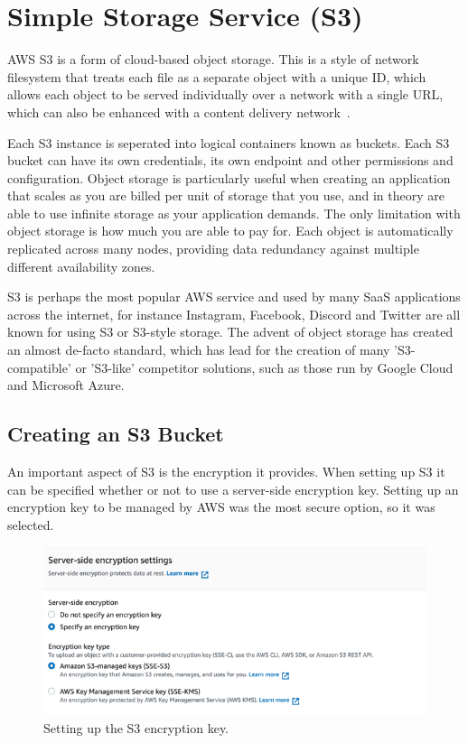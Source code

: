 \chapter{Simple Storage Service (S3)}\label{ch:simple-storage-service}

AWS S3 is a form of cloud-based object storage.
This is a style of network filesystem that treats each file as a separate object with a unique ID, which allows each
object to be served individually over a network with a single URL, which can also be enhanced with a content delivery
network~\parencite{amazon2022cloud}.

Each S3 instance is seperated into logical containers known as buckets.
Each S3 bucket can have its own credentials, its own endpoint and other permissions and configuration.
Object storage is particularly useful when creating an application that scales as you are billed per unit of storage
that you use, and in theory are able to use infinite storage as your application demands.
The only limitation with object storage is how much you are able to pay for.
Each object is automatically replicated across many nodes, providing data redundancy against multiple different
availability zones.

S3 is perhaps the most popular AWS service and used by many SaaS applications across the internet, for instance
Instagram, Facebook, Discord and Twitter are all known for using S3 or S3-style storage.
The advent of object storage has created an almost de-facto standard, which has lead for the creation of many
'S3-compatible' or 'S3-like' competitor solutions, such as those run by Google Cloud and Microsoft Azure.

\pagebreak
\section{Creating an S3 Bucket}\label{sec:creating-an-s3-bucket}

An important aspect of S3 is the encryption it provides.
When setting up S3 it can be specified whether or not to use a server-side encryption key.
Setting up an encryption key to be managed by AWS was the most secure option, so it was selected.

\begin{figure}[!htbp]
    \centering
    \includegraphics[width=\textwidth]{resources/s3/s3_encryption}
    \caption{Setting up the S3 encryption key.}
    \label{fig:s3-image-2}
\end{figure}

